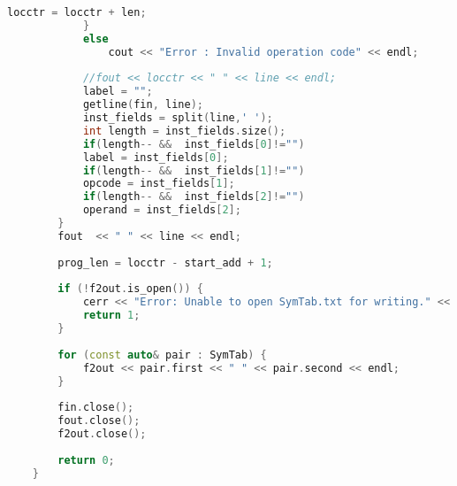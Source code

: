 \documentclass[12pt]{article}
\begin{document}
\begin{lstlisting}[language=C++, caption={Pass 1 - Intermediate File Generator}]
                locctr = locctr + len;
            }
            else
                cout << "Error : Invalid operation code" << endl;
            
            //fout << locctr << " " << line << endl;
            label = "";
            getline(fin, line);
            inst_fields = split(line,' ');
            int length = inst_fields.size();
            if(length-- &&  inst_fields[0]!="")
            label = inst_fields[0];
            if(length-- &&  inst_fields[1]!="")
            opcode = inst_fields[1];
            if(length-- &&  inst_fields[2]!="")
            operand = inst_fields[2];
        }
        fout  << " " << line << endl;
    
        prog_len = locctr - start_add + 1;
    
        if (!f2out.is_open()) {
            cerr << "Error: Unable to open SymTab.txt for writing." << endl;
            return 1;
        }
    
        for (const auto& pair : SymTab) {
            f2out << pair.first << " " << pair.second << endl;
        }
    
        fin.close();
        fout.close();
        f2out.close();
        
        return 0;
    }
\end{lstlisting}
\end{document}
